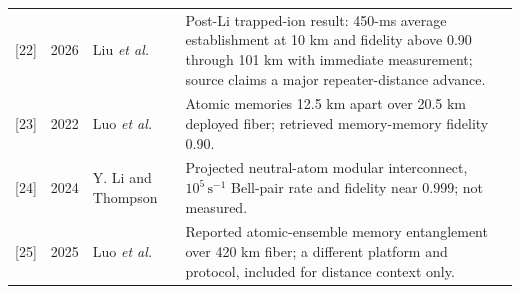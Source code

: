 \documentclass[10pt]{article}
\begin{document}
\begin{longtable}{L{0.055\textwidth}L{0.10\textwidth}L{0.24\textwidth}L{0.47\textwidth}}
  {[22]} & 2026 & Liu \emph{et al.} \cite{liu2026} & Post-Li trapped-ion result: 450-ms average establishment at 10 km and fidelity above 0.90 through 101 km with immediate measurement; source claims a major repeater-distance advance. \\
  {[23]} & 2022 & Luo \emph{et al.} \cite{luo2022} & Atomic memories 12.5 km apart over 20.5 km deployed fiber; retrieved memory-memory fidelity 0.90. \\
  {[24]} & 2024 & Y. Li and Thompson \cite{lithompson2024} & Projected neutral-atom modular interconnect, $10^5\,\mathrm{s}^{-1}$ Bell-pair rate and fidelity near 0.999; not measured. \\
  {[25]} & 2025 & Luo \emph{et al.} \cite{luo2025} & Reported atomic-ensemble memory entanglement over 420 km fiber; a different platform and protocol, included for distance context only. \\
\end{longtable}



\end{document}
